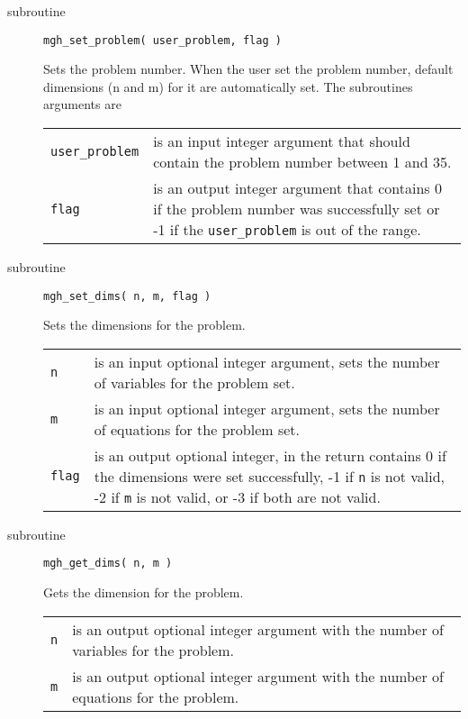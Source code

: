 \documentclass[11pt]{article}
\begin{document}
\begin{description}

\item[subroutine] \verb|mgh_set_problem( user_problem, flag )|

  Sets the problem number. When the user set the problem number,
  default dimensions (n and m) for it are automatically set. The
  subroutines arguments are

  \begin{longtable}{p{2.4cm} p{12cm}}
    \verb|user_problem| & is an input integer argument that should
    contain the problem number between 1 and 35. \\[1ex]

    \verb|flag| & is an output integer argument that contains 0 if the
    problem number was successfully set or -1 if the
    \verb|user_problem| is out of the range.
  \end{longtable}

\item[subroutine] \verb|mgh_set_dims( n, m, flag )|

  Sets the dimensions for the problem.

  \begin{longtable}{p{1cm} p{13.4cm}}
    \verb|n| & is an input optional integer argument, sets the number
    of variables for the problem set. \\[1ex]

    \verb|m| & is an input optional integer argument, sets the number
    of equations for the problem set. \\[1ex]

    \verb|flag| & is an output optional integer, in the return
    contains 0 if the dimensions were set successfully, -1 if \verb|n|
    is not valid, -2 if \verb|m| is not valid, or -3 if both are not
    valid.
  \end{longtable}

\item[subroutine] \verb|mgh_get_dims( n, m )|

  Gets the dimension for the problem.

  \begin{longtable}{p{0.4cm} p{14cm}}
    \verb|n| & is an output optional integer argument with the number
    of variables for the problem. \\[1ex]

    \verb|m| & is an output optional integer argument with the number
    of equations for the problem.
  \end{longtable}


\end{description}
\end{document}
